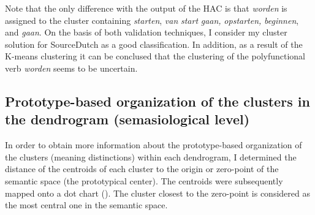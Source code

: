 Note that the only difference with the output of the HAC is that \textit{worden} is assigned to the cluster containing \textit{starten}, \textit{van} \textit{start} \textit{gaan,} \textit{opstarten,} \textit{beginnen}, and \textit{gaan}. On the basis of both validation techniques, I consider my cluster solution for SourceDutch as a good classification. In addition, as a result of the K-means clustering it can be conclused that the clustering of the polyfunctional verb \textit{worden} seems to be uncertain.

\subsection{Prototype-based organization of the clusters in the dendrogram (semasiological level)}
\label{sec:4.2.2}  
In order to obtain more information about the prototype-based organization of the clusters (meaning distinctions) within each dendrogram, I determined the distance of the centroids of each cluster to the origin or zero-point of the semantic space (the prototypical center). The centroids were subsequently mapped onto a dot chart (). The cluster closest to the zero-point is considered as the most central one in the semantic space.

